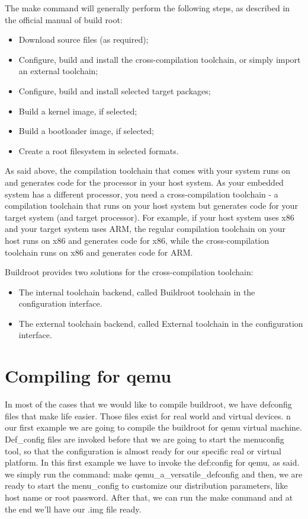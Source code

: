 \documentclass[a4paper,twoside,11pt]{article}
\begin{document}
The make command will generally perform the following steps, as described in the official manual of build root:

\begin{itemize}
\item Download source files (as required);
\item Configure, build and install the cross-compilation toolchain, or simply import an external toolchain;
\item Configure, build and install selected target packages;
\item Build a kernel image, if selected;
\item Build a bootloader image, if selected;
\item Create a root filesystem in selected formats.
\end{itemize}
As said above, the compilation toolchain that comes with your system runs on and generates code for the processor in your host system. As your embedded system has a different processor, you need a cross-compilation toolchain - a compilation toolchain that runs on your host system but generates code for your target system (and target processor). For example, if your host system uses x86 and your target system uses ARM, the regular compilation toolchain on your host runs on x86 and generates code for x86, while the cross-compilation toolchain runs on x86 and generates code for ARM.

Buildroot provides two solutions for the cross-compilation toolchain:
\begin{itemize}
\item The internal toolchain backend, called Buildroot toolchain in the configuration interface.
\item The external toolchain backend, called External toolchain in the configuration interface.
\end{itemize}


\section{Compiling for qemu}
In most of the cases that we would like to compile buildroot, we have defconfig files that make life easier.
Those files exist for real world and virtual devices.
n our first example we are going to compile the buildroot for qemu virtual machine.
Def\_config files are invoked before that we are going to start the menuconfig tool, so that the configuration is almost ready for our specific real or virtual platform.
In this first example we have to invoke the def:config for qemu, as said.
we simply run the command:
make qemu\_a\rm\_versatile\_defconfig
and then, we are ready to start the menu\_config to customize our distribution parameters, like host name or root password.
After that, we can run the make command and at the end we'll have our .img file ready.
\end{document}
